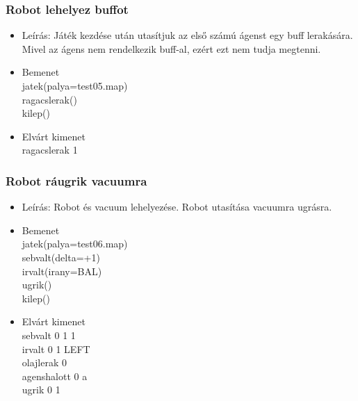 \subsubsection{Robot lehelyez buffot}
\begin{itemize}
  \item Leírás: Játék kezdése után utasítjuk az első számú ágenst egy buff lerakására. Mivel az ágens nem rendelkezik buff-al, ezért ezt nem tudja megtenni.
  \item Bemenet\\ 
    jatek(palya=test05.map)\\
    ragacslerak()\\
    kilep()\\
  \item Elvárt kimenet\\
    ragacslerak 1 \\
\end{itemize}

\subsubsection{Robot ráugrik vacuumra}
\begin{itemize}
  \item Leírás: Robot és vacuum lehelyezése. Robot utasítása vacuumra ugrásra.
  \item Bemenet\\
    jatek(palya=test06.map)\\
    sebvalt(delta=+1)\\
    irvalt(irany=BAL)\\
    ugrik()\\
    kilep()\\
  \item Elvárt kimenet\\
    sebvalt 0 1 1 \\
    irvalt 0 1 LEFT \\
    olajlerak 0 \\ 
    agenshalott 0 a \\
    ugrik 0 1 \\

\end{itemize}

